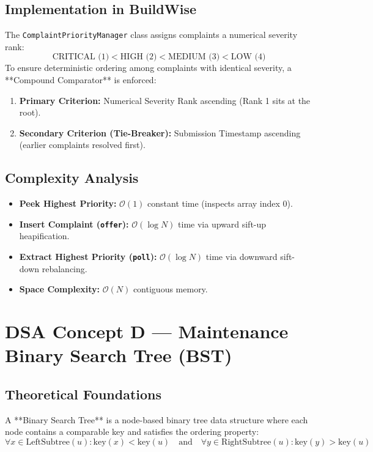 \documentclass[12pt,a4paper]{article}
\begin{document}
\subsection{Implementation in BuildWise}
The \texttt{ComplaintPriorityManager} class assigns complaints a numerical severity rank:
\begin{equation}
    \text{CRITICAL (1)} < \text{HIGH (2)} < \text{MEDIUM (3)} < \text{LOW (4)}
\end{equation}
To ensure deterministic ordering among complaints with identical severity, a **Compound Comparator** is enforced:
\begin{enumerate}[leftmargin=1.5em]
    \item \textbf{Primary Criterion:} Numerical Severity Rank ascending (Rank 1 sits at the root).
    \item \textbf{Secondary Criterion (Tie-Breaker):} Submission Timestamp ascending (earlier complaints resolved first).
\end{enumerate}

\subsection{Complexity Analysis}
\begin{itemize}[leftmargin=1.5em]
    \item \textbf{Peek Highest Priority:} $\mathcal{O}(1)$ constant time (inspects array index 0).
    \item \textbf{Insert Complaint (\texttt{offer}):} $\mathcal{O}(\log N)$ time via upward sift-up heapification.
    \item \textbf{Extract Highest Priority (\texttt{poll}):} $\mathcal{O}(\log N)$ time via downward sift-down rebalancing.
    \item \textbf{Space Complexity:} $\mathcal{O}(N)$ contiguous memory.
\end{itemize}

\section{DSA Concept D --- Maintenance Binary Search Tree (BST)}

\subsection{Theoretical Foundations}
A **Binary Search Tree** is a node-based binary tree data structure where each node contains a comparable key and satisfies the ordering property:
\begin{equation}
    \forall x \in \text{LeftSubtree}(u): \text{key}(x) < \text{key}(u) \quad \text{and} \quad \forall y \in \text{RightSubtree}(u): \text{key}(y) > \text{key}(u)
\end{equation}
\end{document}
